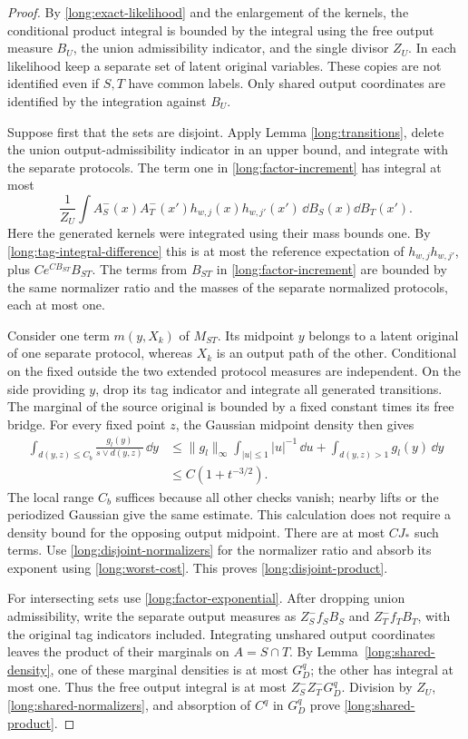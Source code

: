 \begin{proof}
By \eqref{long:exact-likelihood} and the enlargement of the kernels, the
conditional product integral is bounded by the integral using
the free output measure $B_U$, the union admissibility indicator, and the
single divisor $Z_U$.  In each likelihood keep a separate set of latent
original variables.  These copies are not identified even if $S,T$ have
common labels.  Only shared output coordinates are identified by the
integration against $B_U$.

Suppose first that the sets are disjoint.  Apply Lemma
\ref{long:transitions}, delete the union output-admissibility indicator in
an upper bound, and integrate with the separate protocols.  The term one
in \eqref{long:factor-increment} has integral at most
\[
 \frac1{Z_U}
       \int A_S^-(x)A_T^-(x')h_{w,j}(x)h_{w,j'}(x')
                              \,\dd B_S(x)\dd B_T(x').
\]
Here the generated kernels were integrated using their mass bounds one.
By \eqref{long:tag-integral-difference} this is at most the reference
expectation of $h_{w,j}h_{w,j'}$, plus
$Ce^{CB_{ST}}B_{ST}$.  The terms from $B_{ST}$ in
\eqref{long:factor-increment} are bounded by the same normalizer ratio
and the masses of the separate normalized protocols, each at most one.

Consider one term $m(y,X_k)$ of $M_{ST}$.  Its midpoint $y$ belongs to
a latent original of one separate protocol, whereas $X_k$ is an output
path of the other.  Conditional on the fixed outside the two extended
protocol measures are independent.  On the side providing $y$, drop its
tag indicator and integrate all generated transitions.  The marginal of
the source original is bounded by a fixed constant times its free bridge.
For every fixed point $z$, the Gaussian midpoint density then gives
\begin{align*}
 \int_{d(y,z)\le C_b}\frac{g_l(y)}{s\vee d(y,z)}\,\dd y
 &\le \|g_l\|_\infty\int_{|u|\le1}|u|^{-1}\,\dd u
            +\int_{d(y,z)>1}g_l(y)\,\dd y\\
 &\le C(1+t^{-3/2}).
\end{align*}
The local range $C_b$ suffices because all other checks vanish; nearby
lifts or the periodized Gaussian give the same estimate.  This calculation
does not require a density bound for the opposing output midpoint.
There are at most $CJ_*$ such terms.  Use
\eqref{long:disjoint-normalizers} for the normalizer ratio and absorb its
exponent using \eqref{long:worst-cost}.  This proves
\eqref{long:disjoint-product}.

For intersecting sets use \eqref{long:factor-exponential}.  After dropping
union admissibility, write the separate output measures as $Z_S^-f_S B_S$
and $Z_T^-f_T B_T$, with the original tag indicators included.  Integrating
unshared output coordinates leaves the product of their marginals on
$A=S\cap T$.  By Lemma~\ref{long:shared-density}, one of these marginal
densities is at most $G_D^q$; the other has integral at most one.  Thus the
free output integral is at most $Z_S^-Z_T^-G_D^q$.  Division by $Z_U$,
\eqref{long:shared-normalizers}, and absorption of $C^q$ in $G_D^q$
prove \eqref{long:shared-product}.
\end{proof}

